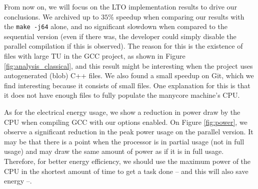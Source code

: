 From now on, we will focus on the LTO implementation results to drive our
conclusions. We archived up to $35\%$ speedup when comparing our results with
the \texttt{make -j64} alone, and no significant slowdown when compared to the
sequential version (even if there was, the developer could simply disable the
parallel compilation if this is observed). The reason for this is the existence
of files with large TU in the GCC project, as shown in Figure
\ref{fig:analysis_classical}, and this result might be interesting when the project
uses autogenerated (blob) C++ files. We also found a small speedup on Git,
which we find interesting because it consists of small files. One explanation
for this is that it does not have enough files to fully populate the manycore
machine's CPU.

As for the electrical energy usage, we show a reduction in power draw by the
CPU when compiling GCC with our options enabled. On Figure \ref{fig:power},
we observe a significant reduction in the peak power usage on the parallel
version. It may be that there is a point when the processor is in partial usage
(not in full usage) and may draw the same amount of power as if it is in full
usage. Therefore, for better energy efficiency, we should use the maximum power
of the CPU in the shortest amount of time to get a task done -- and this will
also save energy --.
